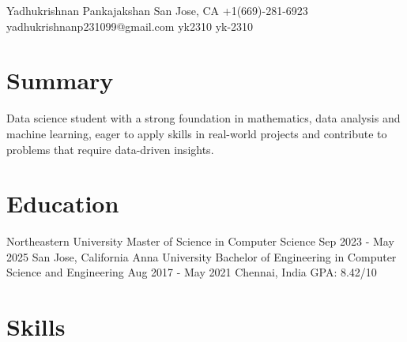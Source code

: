 \documentclass[letterpaper]{resume_config}
\begin{document}
\Header
    {Yadhukrishnan Pankajakshan} %
    {San Jose, CA} %
    {+1(669)-281-6923} %
    {yadhukrishnanp231099@gmail.com} %
    {yk2310} %
    {yk-2310} %

\section{Summary}
{
    Data science student with a strong foundation in mathematics, data analysis and machine learning, eager to apply skills in real-world projects and contribute to problems that require data-driven insights.
}


\section{Education}

\EducationExperience
    {Northeastern University} %
    {Master of Science in Computer Science} %
    {Sep 2023 - May 2025} %
    {San Jose, California} %
    {}
\EducationExperience
    {Anna University} %
    {Bachelor of Engineering in Computer Science and Engineering} %
    {Aug 2017 - May 2021} %
    {Chennai, India} %
    {GPA: 8.42/10}
\vspace{-5pt}

\section{Skills}
\end{document}
